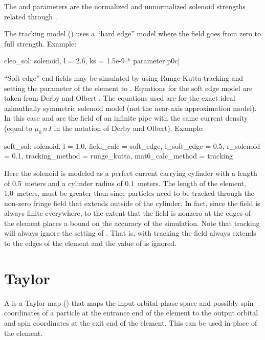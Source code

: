 {The  and  parameters are the normalized and unnormalized solenoid strengths related
through .

The  tracking model () uses a ``hard edge'' model where the field
goes from zero to full strength. 
Example:
\begin{example}
  cleo_sol: solenoid, l = 2.6, ks = 1.5e-9 * parameter[p0c]
\end{example}

``Soft edge'' end fields may be simulated by using Runge-Kutta tracking and setting the
 parameter of the element to . Equations for the soft edge model are
taken from Derby and Olbert \cite{b:derby}. The equations used are for the exact ideal azimuthally
symmetric solenoid model (not the near-axis approximation model). In this case  and
 are the field of an infinite pipe with the same current density (equal to
$\mu_0\,n\,I$ in the notation of Derby and Olbert).  Example:
\begin{example}
  soft_sol: solenoid, l = 1.0, field_calc = soft_edge, l_soft_edge = 0.5, 
              r_solenoid = 0.1, tracking_method = runge_kutta, mat6_calc_method = tracking
\end{example}
Here the solenoid is modeled as a perfect current carrying cylinder with a length of 0.5~meters and
a cylinder radius of 0.1~meters. The length of the element, 1.0~meters, must be greater than
 since particles need to be tracked through the non-zero fringe field that extends
outside of the cylinder. In fact, since the field is always finite everywhere, to the extent that
the field is nonzero at the edges of the element places a bound on the accuracy of the simulation.
Note that  tracking will always ignore the setting of . That is,
with  tracking the field always extends to the edges of the element and the value
of  is ignored.

\newpage

\section{Taylor}
\label{s:taylor}

A  is a Taylor map () that maps the input orbital phase space and
possibly spin coordinates of a particle at the entrance end of the element to the output orbital and
spin coordinates at the exit end of the element. This can be used in place of the \mad {}
element.

}
